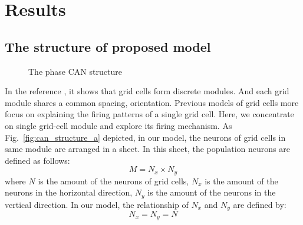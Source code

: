 \documentclass[final,5p,times,twocolumn,authoryear]{elsarticle}
\begin{document}
\section{Results}

\subsection{The structure of proposed model}\label{subsection:structure}

\begin{figure}[!t]
	\centering
	\hspace{-2pt}	

	\caption{The phase CAN structure}
	\label{fig:can_structure}
\end{figure}


In the reference \citep{Stensola2012}, it shows that grid cells form discrete modules. And each grid module shares a common spacing, orientation\citep{Rowland2016}. Previous models of grid cells more focus on explaining the firing patterns of a single grid cell. Here, we concentrate on single grid-cell module and explore its firing mechanism. As Fig.~\ref{fig:can_structure_a} depicted, in our model, the neurons of grid cells in same module are arranged in a sheet. In this sheet, the population neurons are defined as follows:
\begin{equation}
	M = N_x \times N_y
\end{equation}
where $N$ is the amount of the neurons of grid cells, $N_x$ is the amount of the neurons in the horizontal direction, $N_y$ is the amount of the neurons in the vertical direction. In our model, the relationship of $N_x$ and $N_y$ are defined by:
\begin{equation}\label{eq:network_size}
	N_x = N_y = N
\end{equation}
\end{document}
